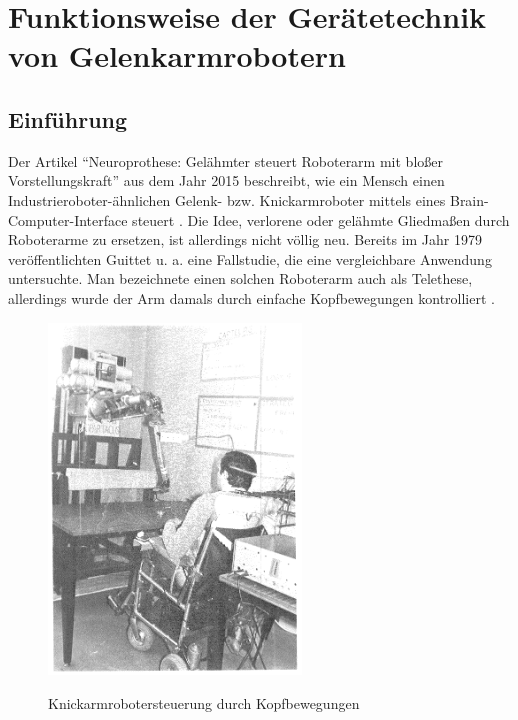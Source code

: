 \documentclass[11pt,ngerman,parskip=half]{scrartcl}
\begin{document}
\pagebreak
\section{Funktionsweise der Gerätetechnik von Gelenkarmrobotern}
\label{sec:john}
\subsection{Einführung}
\label{subsec:john_einfuehrung}
Der Artikel \enquote{Neuroprothese: Gelähmter steuert Roboterarm mit bloßer
Vorstellungskraft} aus dem Jahr 2015 beschreibt, wie ein Mensch einen
Industrieroboter-ähnlichen Gelenk- bzw. Knickarmroboter mittels eines
Brain-Computer-Interface steuert
\parencite[vgl.][]{merkelt_neuroprothesen:_2015}. Die Idee, verlorene oder
gelähmte Gliedmaßen durch Roboterarme zu ersetzen, ist allerdings nicht völlig
neu. Bereits im Jahr 1979 veröffentlichten Guittet u. a. eine Fallstudie, die
eine vergleichbare Anwendung untersuchte. Man bezeichnete einen solchen
Roboterarm auch als Telethese, allerdings wurde der Arm damals durch einfache
Kopfbewegungen kontrolliert \parencite[vgl.][]{guittet_spartacus_1979}.

\begin{figure}[H]
  \centering
  \includegraphics[width=0.6\textwidth]{src/img/john1.png}
  \caption{Knickarmrobotersteuerung durch Kopfbewegungen}
  \label{img:john1}
  \parencite[][84]{guittet_spartacus_1979}
\end{figure}
\pagebreak
\end{document}
